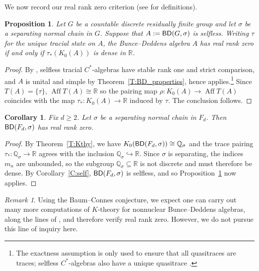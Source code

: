 \documentclass[11pt,a4,leqno]{amsart}
\newtheorem{prop}[thm]{Proposition}
\newtheorem{cor}[thm]{Corollary}
\theoremstyle{definition}
\theoremstyle{remark}
\newtheorem{rem}[thm]{Remark}
\numberwithin{equation}{section}
\theoremstyle{plain}
\newcommand{\Qb}{\mathbb{Q}}
\newcommand{\Rb}{\mathbb{R}}
\newcommand{\BD}{{\sf{BD}}}
\begin{document}
 We now record our real rank zero criterion (see \cite{BroPed91} for definitions).

\begin{prop}\label{P:rr0}
    Let $G$ be a countable discrete residually finite group and let $\sigma$ be a separating normal chain in $G$. Suppose that $A:= \BD(G,\sigma)$ is selfless. Writing $\tau$ for the unique tracial state on $A$, the Bunce--Deddens algebra $A$ has real rank zero if and only if $\tau_*(K_0(A))$ is dense in $\Rb$.
\end{prop}

\begin{proof}
    By \cite[Theorem 3.1]{Rob25}, selfless tracial $C^*$-algebras have stable rank one and strict comparison, and $A$ is unital and simple by Theorem~\ref{T:BD_properties}, hence \cite[Proposition 7.1]{Ror04} applies.\footnote{The exactness assumption is only used to ensure that all quasitraces are traces; selfless $C^*$-algebras also have a unique quasitrace \cite[Theorem 3.1]{Rob25}.} Since $T(A) = \{\tau\}$,  $\operatorname{Aff}T(A) \cong \Rb$ so the pairing map $\rho : K_0(A) \to \operatorname{Aff}T(A)$ coincides with the map $\tau_* : K_0(A) \to \Rb$ induced by $\tau$. The conclusion follows.     
\end{proof}

\begin{cor}\label{C:rr0}
    Fix $d\ge 2$. Let $\sigma$ be a separating normal chain in $F_d$. Then $\BD(F_d,\sigma)$ has real rank zero. 
\end{cor}

\begin{proof}
    By Theorem~\ref{T:Kthy}, we have $K_0(\BD(F_d,\sigma)) \cong \Qb_\sigma$ and the trace pairing $\tau_* : \Qb_\sigma \to \Rb$ agrees with the inclusion $\Qb_\sigma \hookrightarrow \Rb$. Since $\sigma$ is separating, the indices $m_n$ are unbounded, so the subgroup $\Qb_\sigma \subseteq \Rb$ is not discrete and must therefore be dense. By Corollary~\ref{C:self}, $\BD(F_d,\sigma)$ is selfless, and so Proposition~\ref{P:rr0} now applies. 
\end{proof}

\begin{rem}
    Using the Baum--Connes conjecture, we expect one can carry out many more computations of $K$-theory for nonnuclear Bunce--Deddens algebras, along the lines of \cite{Dee23}, and therefore verify real rank zero. However, we do not pursue this line of inquiry here. 
\end{rem}
\end{document}
